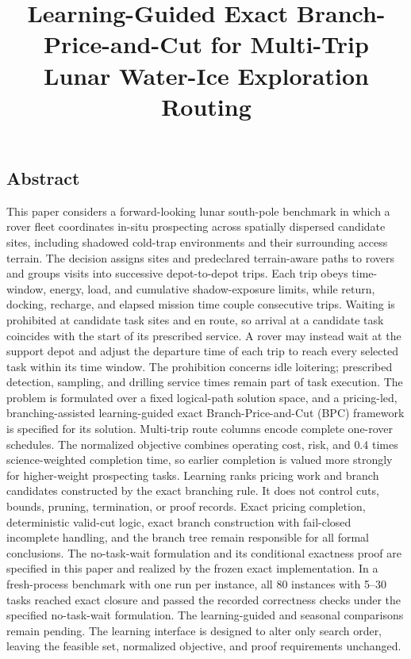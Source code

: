 \documentclass[
  11pt,
]{article}
\title{Learning-Guided Exact Branch-Price-and-Cut for Multi-Trip Lunar
Water-Ice Exploration Routing}
\author{}
\date{}
\begin{document}
\maketitle

\hypertarget{abstract}{%
\subsection{Abstract}\label{abstract}}

This paper considers a forward-looking lunar south-pole benchmark in
which a rover fleet coordinates in-situ prospecting across spatially
dispersed candidate sites, including shadowed cold-trap environments and
their surrounding access terrain. The decision assigns sites and
predeclared terrain-aware paths to rovers and groups visits into
successive depot-to-depot trips. Each trip obeys time-window, energy,
load, and cumulative shadow-exposure limits, while return, docking,
recharge, and elapsed mission time couple consecutive trips. Waiting is
prohibited at candidate task sites and en route, so arrival at a
candidate task coincides with the start of its prescribed service. A
rover may instead wait at the support depot and adjust the departure
time of each trip to reach every selected task within its time window.
The prohibition concerns idle loitering; prescribed detection, sampling,
and drilling service times remain part of task execution. The problem is
formulated over a fixed logical-path solution space, and a pricing-led,
branching-assisted learning-guided exact Branch-Price-and-Cut (BPC)
framework is specified for its solution. Multi-trip route columns encode
complete one-rover schedules. The normalized objective combines
operating cost, risk, and \(0.4\) times science-weighted completion
time, so earlier completion is valued more strongly for higher-weight
prospecting tasks. Learning ranks pricing work and branch candidates
constructed by the exact branching rule. It does not control cuts,
bounds, pruning, termination, or proof records. Exact pricing
completion, deterministic valid-cut logic, exact branch construction
with fail-closed incomplete handling, and the branch tree remain
responsible for all formal conclusions. The no-task-wait formulation and
its conditional exactness proof are specified in this paper and realized
by the frozen exact implementation. In a fresh-process benchmark with
one run per instance, all 80 instances with 5--30 tasks reached exact
closure and passed the recorded correctness checks under the specified
no-task-wait formulation. The learning-guided and seasonal comparisons
remain pending. The learning interface is designed to alter only search
order, leaving the feasible set, normalized objective, and proof
requirements unchanged.
\end{document}
